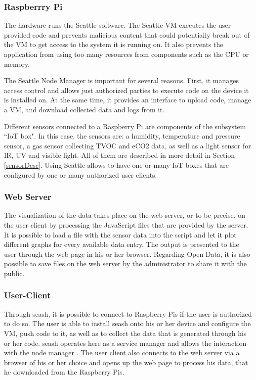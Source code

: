 \documentclass{article}      %
\begin{document}
\subsubsection{Raspberrry Pi}

The hardware runs the Seattle software. The Seattle \gls{VM} executes the user provided code and prevents malicious content that could potentially break out of the \gls{VM} to get access to the system it is running on. It also prevents the application from using too many resources from components such as the \gls{CPU} or memory. \cite[p. 38]{seattlePaper} \cite{seattleFence}

The Seattle Node Manager is important for several reasons. First, it manages access control and allows just authorized parties to execute code on the device it is installed on. At the same time, it provides an interface to upload code, manage a \gls{VM}, and download collected data and logs from it. \cite[p. 38]{seattlePaper}

Different sensors connected to a Raspberry Pi are components of the subsystem ``\gls{IoT} box". In this case, the sensors are: a humidity, temperature and pressure sensor, a gas sensor collecting \gls{TVOC} and \gls{eCO2} data, as well as a light sensor for \gls{IR}, \gls{UV} and visible light. All of them are described in more detail in Section \ref{sensorDesc}. Using Seattle allows to have one or many \gls{IoT} boxes that are configured by one or many authorized user clients.

\subsubsection{Web Server}

The visualization of the data takes place on the web server, or to be precise, on the user client by processing the JavaScript files that are provided by the server. It is possible to load a file with the sensor data into the script and let it plot different graphs for every available data entry. The output is presented to the user through the web page in his or her browser. Regarding Open Data, it is also possible to save files on the web server by the administrator to share it with the public.

\subsubsection{User-Client}

Through \gls{seash}, it is possible to connect to Raspberry Pis if the user is authorized to do so. The user is able to install \gls{seash} onto his or her device and configure the \gls{VM}, push code to it, as well as to collect the data that is generated through his or her code. \Gls{seash} operates here as a service manager and allows the interaction with the node manager \cite[p. 38]{seattlePaper}. The user client also connects to the web server via a browser of his or her choice and opens up the web page to process his data, that he downloaded from the Raspberry Pis.
\end{document}

